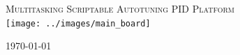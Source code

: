 \begin{titlepage}
\begin{center}

\textsc{\Huge Multitasking Scriptable Autotuning PID Platform}\\[1.5cm]
\texttt{[image: ../images/main\_board]}~

\vfill

\today

\end{center}
\end{titlepage}
